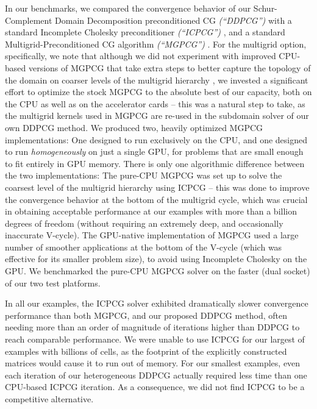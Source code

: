 In our benchmarks, we compared the convergence behavior of our Schur-Complement Domain Decomposition preconditioned CG \emph{(``DDPCG'')} with a standard Incomplete Cholesky
preconditioner \emph{(``ICPCG'')} \cite{Foster:2001:PAO}, and a standard Multigrid-Preconditioned CG algorithm \emph{(``MGPCG'')} \cite{mcadams2010parallel}. For
the multigrid option, specifically, we note that although we did not experiment with improved CPU-based versions of MGPCG that take extra steps to better capture the topology of
the domain on coarser levels of the multigrid hierarchy \cite{Westermann:2014:LiquidAdaptiveHexahedral}, we invested a significant effort to optimize the stock MGPCG to the
absolute best of our capacity, both on the CPU as well as on the accelerator cards  -- this was a natural
step to take, as the multigrid kernels used in MGPCG are re-used in the subdomain solver of our own DDPCG method. We produced two, heavily optimized MGPCG implementations:
One designed to run exclusively on the CPU, and one designed to run \emph{homogeneously} 
on just a single GPU, for problems that are small enough to fit entirely in GPU memory. There is only one algorithmic difference between the two implementations: The pure-CPU MGPCG
was set up to solve the coarsest level of the multigrid hierarchy using ICPCG -- this was done to improve the convergence behavior at the bottom of the multigrid cycle, which
was crucial in obtaining acceptable performance at our examples with more than a billion degrees of freedom (without requiring an extremely deep, and occasionally inaccurate
V-cycle). The GPU-native implementation of MGPCG used a large number of smoother applications at the bottom of the V-cycle (which was effective for its smaller problem size), to
avoid using Incomplete Cholesky on the GPU. We benchmarked the pure-CPU MGPCG solver on the faster (dual socket) of our two test platforms.

In all our examples, the ICPCG solver exhibited dramatically slower convergence performance than both MGPCG, and our proposed DDPCG method, often needing more than an order of
magnitude of iterations higher than DDPCG to reach comparable performance. We were unable to use ICPCG for our largest of examples with billions of cells, as the footprint of the
explicitly constructed matrices would cause it to run out of memory. For our smallest examples, even each iteration of our heterogeneous DDPCG actually required less time than one
CPU-based ICPCG iteration. As a consequence, we did not find ICPCG to be a competitive alternative. 

